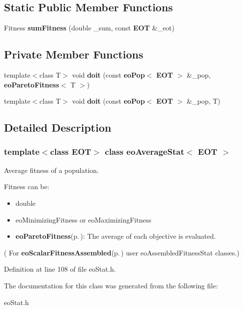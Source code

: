 \subsection*{Static Public Member Functions}
\begin{CompactItemize}
\item 
Fitness {\bf sum\-Fitness} (double \_\-sum, const {\bf EOT} \&\_\-eot)\label{classeo_average_stat_e0}

\end{CompactItemize}
\subsection*{Private Member Functions}
\begin{CompactItemize}
\item 
template$<$class T$>$ void {\bf doit} (const {\bf eo\-Pop}$<$ {\bf EOT} $>$ \&\_\-pop, {\bf eo\-Pareto\-Fitness}$<$ T $>$)\label{classeo_average_stat_d0}

\item 
template$<$class T$>$ void {\bf doit} (const {\bf eo\-Pop}$<$ {\bf EOT} $>$ \&\_\-pop, T)\label{classeo_average_stat_d1}

\end{CompactItemize}


\subsection{Detailed Description}
\subsubsection*{template$<$class EOT$>$ class eo\-Average\-Stat$<$ EOT $>$}

Average fitness of a population. 

Fitness can be:\begin{itemize}
\item double\item eo\-Minimizing\-Fitness or eo\-Maximizing\-Fitness\item {\bf eo\-Pareto\-Fitness}{\rm (p.\,\pageref{classeo_pareto_fitness})}: The average of each objective is evaluated.\end{itemize}


( For {\bf eo\-Scalar\-Fitness\-Assembled}{\rm (p.\,\pageref{classeo_scalar_fitness_assembled})} user eo\-Assembled\-Fitness\-Stat classes.) 



Definition at line 108 of file eo\-Stat.h.

The documentation for this class was generated from the following file:\begin{CompactItemize}
\item 
eo\-Stat.h\end{CompactItemize}
